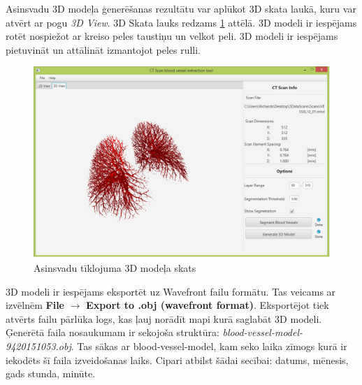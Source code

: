 Asinsvadu 3D modeļa ģenerēšanas rezultātu var aplūkot 3D skata laukā, kuru var atvērt ar pogu \emph{3D View}. 3D Skata lauks redzams \ref{fig:3D-view} attēlā. 3D modeli ir iespējams rotēt nospiežot ar kreiso peles taustiņu un velkot peli. 3D modeli ir iespējams pietuvināt un attālināt izmantojot peles rulli.
\begin{figure}[h]
\begin{center}
\includegraphics[scale=0.45]{img/vessels-3D.png}
\caption{Asinsvadu tīklojuma 3D modeļa skats}
\label{fig:3D-view}
\end{center}
\end{figure}

3D modeli ir iespējams eksportēt uz Wavefront failu formātu. Tas veicams ar izvēlnēm \textbf{File} $\rightarrow$ \textbf{Export to .obj (wavefront format)}. Eksportējot tiek atvērts failu pārlūka logs, kas ļauj norādīt mapi kurā saglabāt 3D modeli. Ģenerētā faila nosaukumam ir sekojoša struktūra: \emph{blood-vessel-model-9420151053.obj}. Tas sākas ar blood-vessel-model, kam seko laika zīmogs kurā ir iekodēts šī faila izveidošanas laiks. Cipari atbilst šādai secībai: datums, mēnesis, gads stunda, minūte.


